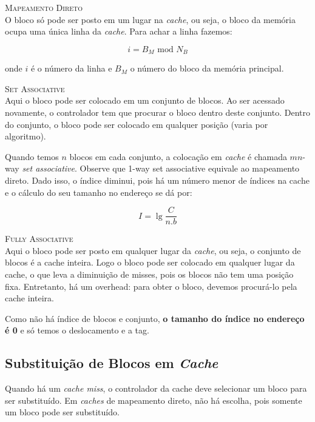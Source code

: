 \textsc{Mapeamento Direto}\\
O bloco só pode ser posto em um lugar na \textit{cache}, ou seja, o bloco da memória ocupa uma única linha da \textit{cache}. Para achar a linha fazemos:

\begin{equation}
  i = B_M \text{ mod } N_B
\end{equation}

onde $i$ é o número da linha e $B_M$ o número do bloco da memória principal.



\textsc{Set Associative}\\
Aqui o bloco pode ser colocado em um conjunto de blocos. Ao ser acessado novamente, o controlador tem que procurar o bloco dentro deste conjunto. Dentro do conjunto, o bloco pode ser colocado em qualquer posição (varia por algoritmo).

Quando temos $n$ blocos em cada conjunto, a colocação em \textit{cache} é chamada $mn$-way \textit{set associative}. Observe que 1-way set associative equivale ao mapeamento direto. Dado isso, o índice diminui, pois há um número menor de índices na cache e o cálculo do seu tamanho no endereço se dá por:

\begin{equation}
  I = \lg{\frac{C}{n.b}}
\end{equation}



\textsc{Fully Associative}\\
Aqui o bloco pode ser posto em qualquer lugar da \textit{cache}, ou seja, o conjunto de blocos é a cache inteira. Logo o bloco pode ser colocado em qualquer lugar da cache, o que leva a diminuição de misses, pois os blocos não tem uma posição fixa. Entretanto, há um overhead: para obter o bloco, devemos procurá-lo pela cache inteira.

Como não há índice de blocos e conjunto, \textbf{o tamanho do índice no endereço é 0} e só temos o deslocamento e a tag.




\subsection{Substituição de Blocos em \textit{Cache}}
Quando há um \textit{cache miss}, o controlador da cache deve selecionar um bloco para ser substituído. Em \textit{caches} de mapeamento direto, não há escolha, pois somente um bloco pode ser substituído.

